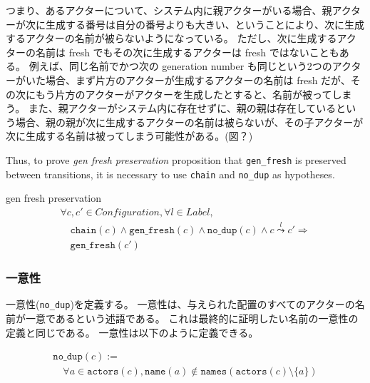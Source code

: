 つまり、あるアクターについて、システム内に親アクターがいる場合、親アクターが次に生成する番号は自分の番号よりも大きい、ということにより、次に生成するアクターの名前が被らないようになっている。
ただし、次に生成するアクターの名前は fresh でもその次に生成するアクターは fresh ではないこともある。
例えば、同じ名前でかつ次の generation number も同じという2つのアクターがいた場合、まず片方のアクターが生成するアクターの名前は fresh だが、その次にもう片方のアクターがアクターを生成したとすると、名前が被ってしまう。
また、親アクターがシステム内に存在せずに、親の親は存在しているという場合、親の親が次に生成するアクターの名前は被らないが、その子アクターが次に生成する名前は被ってしまう可能性がある。(図？)

Thus, to prove \textit{gen fresh preservation} proposition that \texttt{gen\_fresh} is preserved between transitions, it is necessary to use \texttt{chain} and \texttt{no\_dup} as hypotheses.

\begin{lemma}{gen fresh preservation}
\begin{displaymath}
  \begin{array}{l}
    \forall c, c' \in \textit{Configuration}, \forall l \in \textit{Label}, \\
    \quad \texttt{chain}(c) \wedge \texttt{gen\_fresh}(c) \wedge \texttt{no\_dup}(c) \wedge c \overset{l}{\leadsto} c' \Rightarrow \\
    \quad \texttt{gen\_fresh}(c')
  \end{array}
\end{displaymath}
\end{lemma}

\subsubsection{一意性}

一意性(\texttt{no\_dup})を定義する。
一意性は、与えられた配置のすべてのアクターの名前が一意であるという述語である。
これは最終的に証明したい名前の一意性の定義と同じである。
一意性は以下のように定義できる。

\begin{displaymath}
  \begin{array}{l}
    \texttt{no\_dup}(c) := \\
    \quad \forall a \in \texttt{actors}(c), \texttt{name}(a) \notin
    \texttt{names}(\texttt{actors}(c) \setminus \{a\})
  \end{array}
\end{displaymath}

